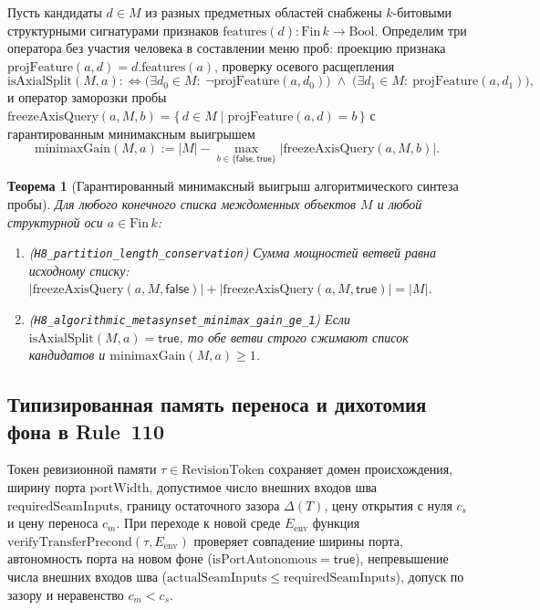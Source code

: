 \documentclass[11pt,a4paper]{article}
\theoremstyle{cleanthm}
\newtheorem{theorem}{Теорема}[section]
\theoremstyle{cleandef}
\begin{document}
Пусть кандидаты $d\in M$ из разных предметных областей снабжены $k$-битовыми структурными сигнатурами признаков $\mathrm{features}(d):\mathrm{Fin}\,k\to\mathrm{Bool}$. Определим три оператора без участия человека в составлении меню проб: проекцию признака $\mathrm{projFeature}(a,d)=d.\mathrm{features}(a)$, проверку осевого расщепления
\begin{equation}
  \mathrm{isAxialSplit}(M, a) :\iff \bigl(\exists d_0\in M:\ \neg\mathrm{projFeature}(a,d_0)\bigr) \;\land\; \bigl(\exists d_1\in M:\ \mathrm{projFeature}(a,d_1)\bigr),
\end{equation}
и оператор заморозки пробы $\mathrm{freezeAxisQuery}(a,M,b) = \{\,d\in M \mid \mathrm{projFeature}(a,d)=b\,\}$ с гарантированным минимаксным выигрышем
\begin{equation}
  \mathrm{minimaxGain}(M,a) := |M| - \max_{b\in\{\mathsf{false},\mathsf{true}\}}\bigl|\mathrm{freezeAxisQuery}(a,M,b)\bigr|.
\end{equation}

\begin{theorem}[Гарантированный минимаксный выигрыш алгоритмического синтеза пробы]
\label{thm:h8_metasynset}
Для любого конечного списка междоменных объектов $M$ и любой структурной оси $a\in\mathrm{Fin}\,k$:
\begin{enumerate}
  \item (\texttt{H8\_partition\_\allowbreak length\_\allowbreak conservation}) Сумма мощностей ветвей равна исходному списку: $|\mathrm{freezeAxisQuery}(a,M,\mathsf{false})| + |\mathrm{freezeAxisQuery}(a,M,\mathsf{true})| = |M|$.
  \item (\texttt{H8\_algorithmic\_\allowbreak metasynset\_\allowbreak minimax\_\allowbreak gain\_\allowbreak ge\_1}) Если $\mathrm{isAxialSplit}(M,a)=\mathsf{true}$, то обе ветви строго сжимают список кандидатов и $\mathrm{minimaxGain}(M,a)\ge 1$.
\end{enumerate}
\end{theorem}

\subsection{Типизированная память переноса и дихотомия фона в Rule~110}

Токен ревизионной памяти $\tau\in\mathrm{RevisionToken}$ сохраняет домен происхождения, ширину порта $\mathrm{portWidth}$, допустимое число внешних входов шва $\mathrm{requiredSeamInputs}$, границу остаточного зазора $\Delta(T)$, цену открытия с нуля $c_s$ и цену переноса $c_m$. При переходе к новой среде $E_{\mathrm{env}}$ функция $\mathrm{verifyTransferPrecond}(\tau,E_{\mathrm{env}})$ проверяет совпадение ширины порта, автономность порта на новом фоне ($\mathrm{isPortAutonomous}=\mathsf{true}$), непревышение числа внешних входов шва ($\mathrm{actualSeamInputs}\le\mathrm{requiredSeamInputs}$), допуск по зазору и неравенство $c_m < c_s$.
\end{document}
